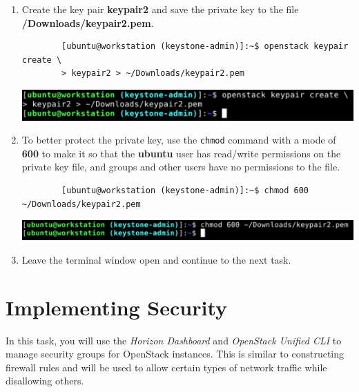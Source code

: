 \documentclass[letterpaper, 12pt]{article}
\begin{document}
\begin{enumerate}
    \item Create the key pair \textbf{keypair2} and save the private key to the file
    \textbf{\texttildemid/Downloads/keypair2.pem}.
    \begin{lstlisting}
        [ubuntu@workstation (keystone-admin)]:~$ openstack keypair create \
        > keypair2 > ~/Downloads/keypair2.pem
    \end{lstlisting}

    \begin{center}
        \includegraphics[width=\linewidth]{images/part4/step7.png}
    \end{center}

    \item To better protect the private key, use the \texttt{chmod} command with a mode of \textbf{600} to make it so
    that the \textbf{ubuntu} user has read/write permissions on the private key file, and groups and other users
    have no permissions to the file.
    \begin{lstlisting}
        [ubuntu@workstation (keystone-admin)]:~$ chmod 600 ~/Downloads/keypair2.pem
    \end{lstlisting}

    \begin{center}
        \includegraphics[width=\linewidth]{images/part4/step8.png}
    \end{center}

    \item Leave the terminal window open and continue to the next task.

\end{enumerate}

\section{Implementing Security}
\label{sec:implementing_security}
In this task, you will use the \textit{Horizon Dashboard} and \textit{OpenStack Unified CLI} to manage security groups
for OpenStack instances. This is similar to constructing firewall rules and will be used to allow certain types of
network traffic while disallowing others.
\end{document}
